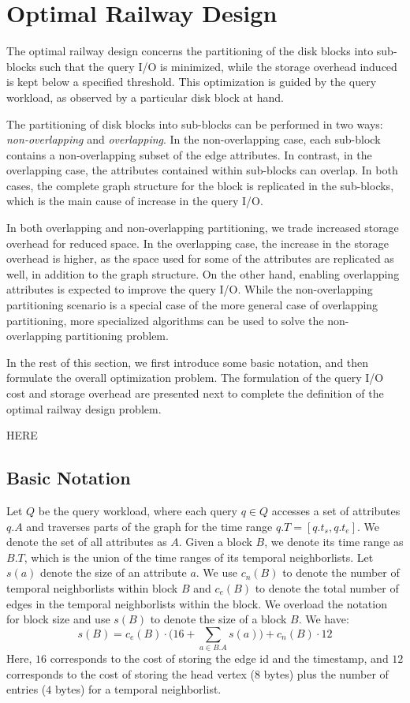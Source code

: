 \section{Optimal Railway Design}\label{sec:optimal}  
The optimal railway design concerns the partitioning of the disk blocks into
sub-blocks such that the query I/O is minimized, while the storage overhead
induced is kept below a specified threshold. This optimization is guided by
the query workload, as observed by a particular disk block at hand.

The partitioning of disk blocks into sub-blocks can be performed in two ways:
\emph{non-overlapping} and \emph{overlapping}. In the non-overlapping case,
each sub-block contains a non-overlapping subset of the edge attributes. In
contrast, in the overlapping case, the attributes contained within sub-blocks
can overlap. In both cases, the complete graph structure for the block is
replicated in the sub-blocks, which is the main cause of increase in the query
I/O. 

In both overlapping and non-overlapping partitioning, we trade increased
storage  overhead for reduced space. In the overlapping case, the increase in
the storage overhead is higher, as the space used for some of the attributes
are replicated  as well, in addition to the graph structure. On the other
hand, enabling overlapping attributes is expected to improve the query I/O.
While the non-overlapping partitioning scenario is a special case of the more
general case of overlapping partitioning, more specialized algorithms can be
used to solve the non-overlapping partitioning problem.

In the rest of this section, we first introduce some basic notation, and then
formulate the overall optimization problem. The formulation of the query I/O
cost and  storage overhead are presented next to complete the definition of
the optimal railway design problem.

HERE

\subsection{Basic Notation}
Let $Q$ be the query workload, where each query $q\in Q$ accesses a set of
attributes $q.A$ and traverses parts of the graph for the time range
$q.T=[q.t_s,q.t_e]$. We denote the set of all attributes as $A$. Given a block
$B$, we denote its time range as $B.T$, which is the union of the time ranges
of its temporal neighborlists. Let $s(a)$ denote the size of an attribute $a$.
We use $c_n(B)$ to denote the number of temporal neighborlists within block
$B$ and $c_e(B)$ to denote the total number of edges in the temporal
neighborlists within the block. We overload the notation for block size and
use $s(B)$ to denote the size of a block $B$. We have: 
\begin{equation}
s(B) = c_e(B) \cdot \Big(16 + \sum_{a\in B.A} s(a)\Big) + c_n(B) \cdot 12  
\end{equation}
Here, $16$ corresponds to the cost of storing the edge id and the timestamp,
and $12$ corresponds to the cost of storing the head vertex ($8$ bytes) plus
the number of entries ($4$ bytes) for a temporal neighborlist. 

